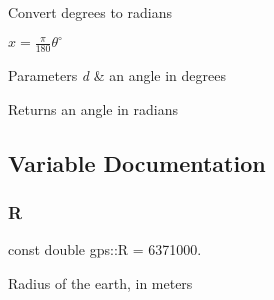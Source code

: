 Convert degrees to radians

$ x = \frac{\pi}{180} \theta^\circ $


\begin{DoxyParams}{Parameters}
{\em d} & an angle in degrees \\
\hline
\end{DoxyParams}
\begin{DoxyReturn}{Returns}
an angle in radians 
\end{DoxyReturn}


\subsection{Variable Documentation}
\mbox{\label{namespacegps_a336bcadf804afba736e0cf773b5a36e8}} 
\subsubsection{\texorpdfstring{R}{R}}
{\footnotesize\ttfamily const double gps\+::R = 6371000.}

Radius of the earth, in meters 